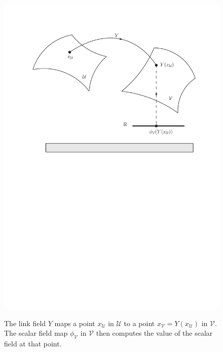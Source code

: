 \begin{figure}[!t]
      \begin{center}
{\includegraphics[scale=0.7]{images/mapping3}}
      \end{center}
\caption{The link field $Y$ maps a point $x_{\mathcal{U}}$ in $\mathcal{U}$ to a point $x_{\mathcal{V}} = Y(x_{\mathcal{U}})$ in $\mathcal{V}$. The scalar field map $\phi_{\mathcal{V}}$ in $\mathcal{V}$ then computes the value of the scalar field at that point.} \label{fig:mapping3}
\end{figure}

